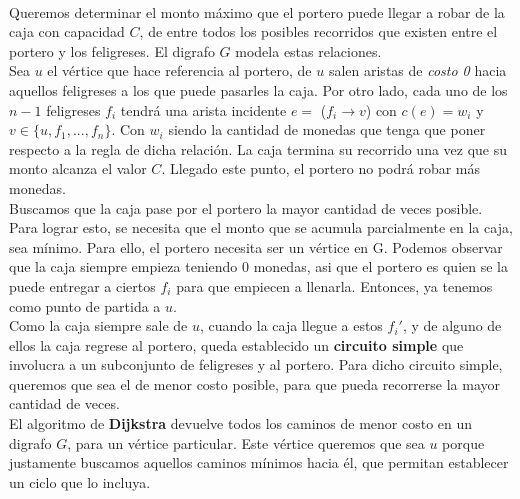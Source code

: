 \documentclass[../main.tex]{subfiles}
\begin{document}
\paragraph{} Queremos determinar el monto máximo que el portero puede llegar a robar de la caja con capacidad $C$, de entre todos los posibles recorridos que existen entre el portero y los feligreses. El digrafo $G$ modela estas relaciones. \\
Sea $u$ el vértice que hace referencia al portero, de $u$ salen aristas de \textit{costo 0} hacia aquellos feligreses a los que puede pasarles la caja. Por otro lado, cada uno de los $n-1$ feligreses $f_i$ tendrá una arista incidente $e =$ ($f_i \rightarrow v$) con $c(e) = w_i$ y $v \in \lbrace u, f_1, ..., f_n \rbrace $. Con $w_i$ siendo la cantidad de monedas que tenga que poner respecto a la regla de dicha relación. La caja termina su recorrido una vez que su monto alcanza el valor $C$. Llegado este punto, el portero no podrá robar más monedas. \\
Buscamos que la caja pase por el portero la mayor cantidad de veces posible. Para lograr esto, se necesita que el monto que se acumula parcialmente en la caja, sea m\'inimo. Para ello, el portero necesita ser un vértice en G. %
Podemos observar que la caja siempre empieza teniendo 0 monedas, asi que el portero es quien se la puede entregar a ciertos $f_i$ para que empiecen a llenarla. Entonces, ya tenemos como punto de partida a $u$. \\
Como la caja siempre sale de $u$, cuando la caja llegue a estos $f_i'$, y de alguno de ellos la caja regrese al portero, queda establecido un \textbf{circuito simple} que involucra a un subconjunto de feligreses y al portero. %
Para dicho circuito simple, queremos que sea el de menor costo posible, para que pueda recorrerse la mayor cantidad de veces. \\
El algoritmo de \textbf{Dijkstra} devuelve todos los caminos de menor costo en un digrafo $G$, para un vértice particular. Este vértice queremos que sea $u$ porque justamente buscamos aquellos caminos mínimos hacia él, que permitan establecer un ciclo que lo incluya.
\end{document}
